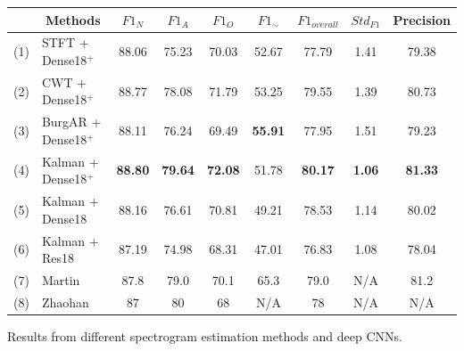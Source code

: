 \documentclass[portrait,a0,final]{a0poster} %
\newcommand{\sectionspace}{10mm} %
\newcommand{\figurespace}{10mm} %
\begin{document}
\begin{minipage}{0.98\linewidth}
\begin{minipage}[t]{0.47\linewidth}
\begin{minipage}[c]{\linewidth}
\large
\vspace{\figurespace}
\begin{tabular}{|l|l|c|c|c|c|c|c|c|}
	\hline
	& \multicolumn{1}{c|}{Methods}           & $F1_N$        & $F1_A$        & $F1_O$      & $F1_\sim$     & $F1_{overall}$  & $Std_{F1}$ & Precision \\ \hline
	(1) & STFT + Dense18$^+$                          & 88.06          & 75.23          & 70.03        & 52.67          & 77.79          & 1.41      & 79.38          \\ \hline
	(2) & CWT + Dense18$^+$                           & 88.77          & 78.08          & 71.79        & 53.25          & 79.55          & 1.39      & 80.73          \\ \hline
	(3) & BurgAR + Dense18$^+$                         & 88.11          & 76.24          & 69.49        & \textbf{55.91} & 77.95          & 1.51      & 79.23          \\ \hline
	(4) & Kalman + Dense18$^+$                        & \textbf{88.80} & \textbf{79.64} & \textbf{72.08}        & 51.78          & \textbf{80.17} & \textbf{1.06}      & \textbf{81.33} \\ \hline
	(5) & Kalman + Dense18                       & 88.16          & 76.61          & 70.81        & 49.21          & 78.53          & 1.14      & 80.02          \\ \hline
	(6) & Kalman + Res18                         & 87.19          & 74.98          & 68.31        & 47.01          & 76.83          & 1.08      & 78.04          \\ \hline
	(7) & Martin & 87.8            & 79.0            & 70.1 & 65.3   & 79.0            & N/A        & 81.2           \\ \hline
	(8) & Zhaohan                                & 87              & 80              & 68            & N/A             & 78              & N/A        & N/A             \\ \hline
\end{tabular}

\vspace{5mm}
Results from different spectrogram estimation methods and deep CNNs.
\end{minipage}
\setlength{\parindent}{10mm}

\vspace{\sectionspace}

\end{minipage}
\end{minipage}
\end{document}
